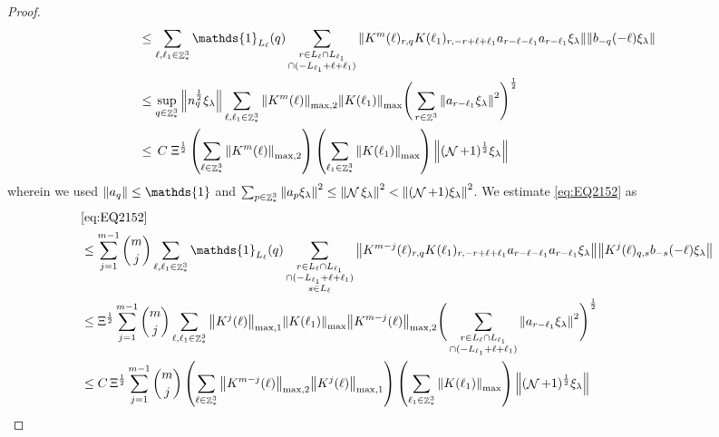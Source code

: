 \documentclass[12pt,a4paper]{article}
\numberwithin{equation}{section}
\newcommand{\1}{\mathbb{I}}
\DeclareMathOperator{\Z}{\mathbb{Z}}
\DeclareMathOperator{\NN}{\mathcal{N}}
\newcommand{\half}{\frac{1}{2}}
\theoremstyle{plain}
\theoremstyle{definition}
\theoremstyle{remark}
\theoremstyle{plain}
\theoremstyle{definition}
\theoremstyle{remark}
\begin{document}
\begin{proof}
\begin{align}
	&\leq \sum\limits_{\ell, \ell_1\in \Z^3_*} \mathds{1}_{L_{\ell}}(q) \sum\limits_{\substack{r\in L_{\ell} \cap L_{\ell_1} \\ \cap (-L_{\ell_1}+\ell+\ell_1)}} \norm{K^m(\ell)_{r,q} K(\ell_1)_{r,-r+\ell+\ell_1} a_{r-\ell-\ell_1} a_{r-\ell_1} \xi_\lambda}\norm{  b_{-q}(-\ell) \xi_\lambda}\nonumber\\
	&\leq \sup\limits_{q \in \Z^3_*} \norm{ n_{q}^\half \xi_\lambda} \sum\limits_{\ell, \ell_1\in \Z^3_*} \norm{K^m(\ell)}_{\mathrm{max,2}} \norm{K(\ell_1)}_{\max} \Bigg( \sum\limits_{r\in \Z^3} \norm{  a_{r-\ell_1} \xi_\lambda}^2\Bigg)^\half\nonumber\\    	
	&\leq \,C\; \Xi^\half \left(\sum\limits_{\ell \in \Z^3_*} \norm{K^m(\ell)}_{\mathrm{max,2}}\right)\left( \sum\limits_{\ell_1\in \Z^3_*} \norm{ K(\ell_1)}_{\max} \right) \norm{ (\NN+1)^\half \xi_\lambda }\label{eq:estEQ2151}
\end{align} 
wherein we used $\norm{a_q} \leq \mathds{1}$ and $\sum_{p\in \Z^3_*}\norm{a_p \xi_\lambda}^2\leq\norm{\NN\xi_\lambda}^2<\norm{(\NN+1)\xi_\lambda}^2$. We estimate \eqref{eq:EQ2152} as
\begin{align}
	&\eqref{eq:EQ2152}\nonumber\\
	&\leq  \sum\limits_{j=1}^{m-1} {{m}\choose j} \sum\limits_{\ell, \ell_1\in \Z^3_*}\mathds{1}_{L_{\ell}}(q) \sum\limits_{\substack{r\in L_{\ell} \cap L_{\ell_1}\\ \cap (-L_{\ell_1}+\ell+\ell_1)\\ s \in L_{\ell}}}  \norm{ K^{m-j}(\ell)_{r,q} K(\ell_1)_{r,-r+\ell+\ell_1}  a_{r-\ell-\ell_1} a_{r-\ell_1} \xi_\lambda}\norm{ K^j(\ell)_{q,s}  b_{-s}(-\ell) \xi_\lambda }\nonumber\\
	&\leq \Xi^\half \sum\limits_{j=1}^{m-1} {{m}\choose j} \sum\limits_{\ell, \ell_1\in \Z^3_*} \norm{K^{j}(\ell)}_{\mathrm{max,1}}  \norm{K(\ell_1)}_{\max} \norm{K^{m-j}(\ell)}_{\mathrm{max,2}} \Bigg(\sum\limits_{\substack{r\in L_{\ell} \cap L_{\ell_1}\\ \cap (-L_{\ell_1}+\ell+\ell_1)}} \norm{ a_{r-\ell_1} \xi_\lambda}^2\Bigg)^\half\nonumber\\
	&\leq  C\,\Xi^\half  \sum\limits_{j=1}^{m-1} {{m}\choose j} \left( \sum\limits_{\ell \in \Z^3_*} \norm{K^{m-j}(\ell)}_{\mathrm{max,2}} \norm{ K^{j}(\ell)}_{\max,1}\right) \left( \sum\limits_{ \ell_1\in \Z^3_*}\norm{ K(\ell_1) }_{\max} \right) \norm{ (\NN+1)^\half \xi_\lambda }\label{eq:estEQ2152}
\end{align}
    

\end{proof}
\end{document}
